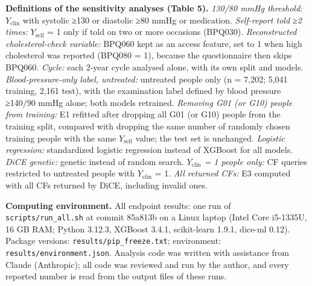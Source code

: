 \documentclass[preprint,review,12pt,times]{elsarticle}
\begin{document}
\textbf{Definitions of the sensitivity analyses (Table 5).} \emph{130/80
mmHg threshold:} \(Y_{\mathrm{clin}}\) with systolic ≥130 or diastolic
≥80 mmHg or medication. \emph{Self-report told ≥2 times:}
\(Y_{\mathrm{self}}\) = 1 only if told on two or more occasions
(BPQ030). \emph{Reconstructed cholesterol-check variable:} BPQ060 kept
as an access feature, set to 1 when high cholesterol was reported
(BPQ080 = 1), because the questionnaire then skips BPQ060. \emph{Cycle:}
each 2-year cycle analysed alone, with its own split and models.
\emph{Blood-pressure-only label, untreated:} untreated people only (n =
7,202; 5,041 training, 2,161 test), with the examination label defined
by blood pressure ≥140/90 mmHg alone; both models retrained.
\emph{Removing G01 (or G10) people from training:} E1 refitted after
dropping all G01 (or G10) people from the training split, compared with
dropping the same number of randomly chosen training people with the
same \(Y_{\mathrm{self}}\) value; the test set is unchanged.
\emph{Logistic regression:} standardized logistic regression instead of
XGBoost for all models. \emph{DiCE genetic:} genetic instead of random
search. \emph{\(Y_{\mathrm{clin}}\) = 1 people only:} CF queries
restricted to untreated people with \(Y_{\mathrm{clin}}\) = 1. \emph{All
returned CFs:} E3 computed with all CFs returned by DiCE, including
invalid ones.

\textbf{Computing environment.} All endpoint results: one run of
\texttt{scripts/\allowbreak{}run\_\allowbreak{}all.sh} at commit 85a813b
on a Linux laptop (Intel Core i5-1335U, 16 GB RAM; Python 3.12.3,
XGBoost 3.4.1, scikit-learn 1.9.1, dice-ml 0.12). Package versions:
\texttt{results/\allowbreak{}pip\_\allowbreak{}freeze.txt}; environment:
\texttt{results/\allowbreak{}environment.json}. Analysis code was
written with assistance from Claude (Anthropic); all code was reviewed
and run by the author, and every reported number is read from the output
files of these runs.
\end{document}
